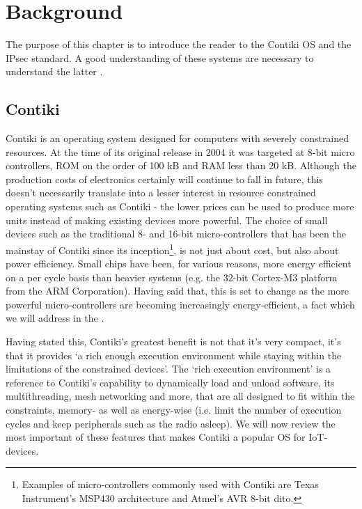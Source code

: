 \documentclass[final,a4paper,twoside,11pt,onecolumn]{report}
\begin{document}
\chapter{Background}
\label{cha:bg}
The purpose of this chapter is to introduce the reader to the Contiki OS and the IPsec standard. A good understanding of these systems are necessary to understand the latter .

\section{Contiki}
Contiki is an operating system designed for computers with severely constrained resources\cite{dunkels04contiki}. At the time of its original release in 2004 it was targeted at 8-bit micro controllers, ROM on the order of 100 kB and RAM less than 20 kB\citep[1]{dunkels04contiki}. Although the production costs of electronics certainly will continue to fall in future, this doesn't necessarily translate into a lesser interest in resource constrained operating systems such as Contiki - the lower prices can be used to produce more units instead of making existing devices more powerful. The choice of small devices such as the traditional 8- and 16-bit micro-controllers that has been the mainstay of Contiki since its inception\footnote{Examples of micro-controllers commonly used with Contiki are Texas Instrument's MSP430 architecture and Atmel's AVR 8-bit dito.}, is not just about cost, but also about power efficiency. Small chips have been, for various reasons, more energy efficient on a per cycle basis than heavier systems (e.g. the 32-bit  Cortex-M3 platform from the ARM Corporation). Having said that, this is set to change as the more powerful micro-controllers are becoming increasingly energy-efficient, a fact which we will address in the .

Having stated this, Contiki's greatest benefit is not that it's very compact, it's that it provides `a rich enough execution environment while staying within the limitations of the constrained devices'\citep[Introduction]{dunkels04contiki}. The `rich execution environment' is a reference to Contiki's capability to dynamically load and unload software, its multithreading, mesh networking\cite{tsiftes10rpl} and more, that are all designed to fit within the constraints, memory- as well as energy-wise (i.e. limit the number of execution cycles and keep peripherals such as the radio asleep). We will now review the most important of these features that makes Contiki a popular OS for IoT-devices.
\end{document}
